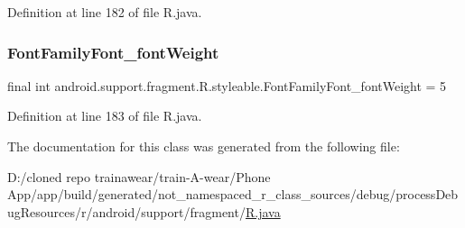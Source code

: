 Definition at line 182 of file R.\+java.

\mbox{\label{classandroid_1_1support_1_1fragment_1_1_r_1_1styleable_a8af402b9cdd397b2b12747e94e2e362c}} 
\subsubsection{\texorpdfstring{FontFamilyFont\_fontWeight}{FontFamilyFont\_fontWeight}}
{\footnotesize\ttfamily final int android.\+support.\+fragment.\+R.\+styleable.\+Font\+Family\+Font\+\_\+font\+Weight = 5\hspace{0.3cm}{\ttfamily [static]}}



Definition at line 183 of file R.\+java.



The documentation for this class was generated from the following file\+:\begin{DoxyCompactItemize}
\item 
D\+:/cloned repo trainawear/train-\/\+A-\/wear/\+Phone App/app/build/generated/not\+\_\+namespaced\+\_\+r\+\_\+class\+\_\+sources/debug/process\+Debug\+Resources/r/android/support/fragment/\mbox{\hyperlink{process_debug_resources_2r_2android_2support_2fragment_2_r_8java}{R.\+java}}\end{DoxyCompactItemize}
